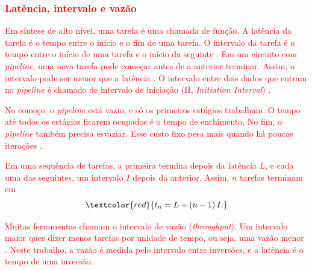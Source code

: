 \subsubsection{\textcolor{red}{Latência, intervalo e vazão}}\label{subsubsec:latencia-intervalo}
\textcolor{red}{Em síntese de alto nível, uma tarefa é uma chamada de função. A latência da tarefa é o tempo entre o início e o fim de uma tarefa. O intervalo da tarefa é o tempo entre o início de uma tarefa e o início da seguinte \cite[p.~20]{kastner-hls}. Em um circuito com \textit{pipeline}, uma nova tarefa pode começar antes de a anterior terminar. Assim, o intervalo pode ser menor que a latência \cite[p.~21]{kastner-hls}. O intervalo entre dois dados que entram no \textit{pipeline} é chamado de intervalo de iniciação (II, \textit{Initiation Interval}) \cite[p.~21]{kastner-hls}.}

\textcolor{red}{No começo, o \textit{pipeline} está vazio, e só os primeiros estágios trabalham. O tempo até todos os estágios ficarem ocupados é o tempo de enchimento. No fim, o \textit{pipeline} também precisa esvaziar. Esse custo fixo pesa mais quando há poucas iterações \cite[pp.~114 e 146]{kastner-hls}.}

\textcolor{red}{Em uma sequência de tarefas, a primeira termina depois da latência $L$, e cada uma das seguintes, um intervalo $I$ depois da anterior. Assim, $n$ tarefas terminam em}
\begin{equation}\label{eq:fim-tarefas}
\textcolor{red}{t_n = L + (n-1)\, I.}
\end{equation}

\textcolor{red}{Muitas ferramentas chamam o intervalo de vazão (\textit{throughput}). Um intervalo maior quer dizer menos tarefas por unidade de tempo, ou seja, uma vazão menor \cite[p.~22]{kastner-hls}. Neste trabalho, a vazão é medida pelo intervalo entre inversões, e a latência é o tempo de uma inversão.}


